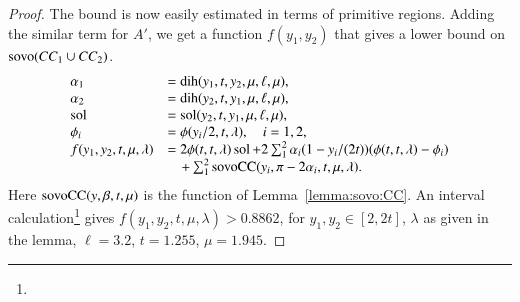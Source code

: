 \begin{proof}
The bound is now easily estimated in terms of primitive
regions.  Adding the similar
term for $A'$, we get
a function $f(y_1,y_2)$ that gives a lower bound on 
${\operatorname{sovo}}(CC_1\cup CC_2)$.  
    $$
    \begin{array}{lll}
    \alpha_1 &= \operatorname{dih}(y_1,t,y_2,\mu,\ell,\mu),\\
    \alpha_2 &= \operatorname{dih}(y_2,t,y_1,\mu,\ell,\mu),\\
    \operatorname{sol} &= \operatorname{sol}(y_2,t,y_1,\mu,\ell,\mu),\\
    \phi_i &= \phi(y_i/2,t,\lambda),\quad i=1,2,\\
    f(y_1,y_2,t,\mu,\lambda)&=
    2\phi(t,t,\lambda)\operatorname{sol}+
    2\sum_1^2 \alpha_i(1-y_i/(2t))(\phi(t,t,\lambda)-\phi_i)\\
        &\quad +
       \sum_1^2 {\operatorname{sovoCC}}(y_i,\pi-2\alpha_i,t,\mu,\lambda).
    \end{array}
    $$
Here ${\operatorname{sovoCC}}(y,\beta,t,\mu)$ is the function
of Lemma~\ref{lemma:sovo:CC}.
An interval calculation\footnote{} %
gives $f(y_1,y_2,t,\mu,\lambda)>0.8862$, for $y_1,y_2\in[2,2t]$,
$\lambda$ as given in the lemma, $\ell=3.2$, $t=1.255$, $\mu=1.945$.
\end{proof}









